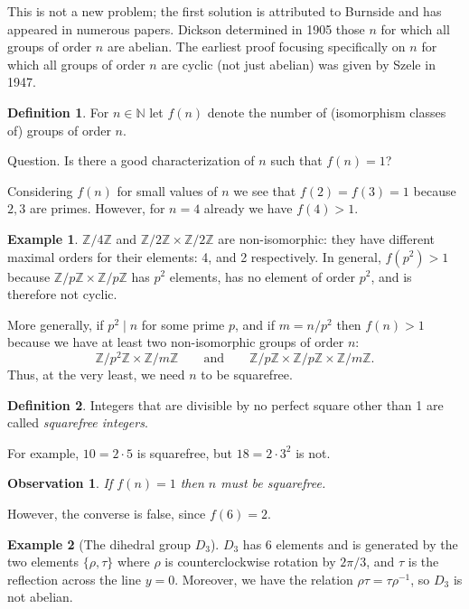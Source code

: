 \documentclass[12pt,reqno]{amsart}
\theoremstyle{plain}
\newtheorem{obs}[thm]{Observation}
\theoremstyle{definition}
\newtheorem*{defn}{Definition}
\newtheorem{eg}{Example}
\numberwithin{equation}{section}
\begin{document}
This is not a new problem; the first solution is attributed to Burnside and has appeared in numerous papers. Dickson \cite{4} determined in 1905 those $n$ for which all groups of order $n$ are abelian. The earliest proof focusing specifically on $n$ for which all groups of order $n$ are cyclic (not just abelian) was given by Szele \cite{7} in 1947.

\begin{defn}
For $n \in \mathbb{N}$ let $f(n)$ denote the number of (isomorphism classes of) groups of order $n$.
\end{defn}

{\sc Question.} Is there a good characterization of $n$ such that $f(n) = 1$?

Considering $f(n)$ for small values of $n$ we see that $f(2)=f(3)=1$ because $2, 3$ are primes. However, for $n=4$ already we have $f(4)>1$.

\begin{eg}
$\mathbb{Z}/4\mathbb{Z}$ and $\mathbb{Z}/2\mathbb{Z}\times\mathbb{Z}/2\mathbb{Z}$ are non-isomorphic: they have different maximal orders for their elements: 4, and 2 respectively. In general, $f(p^2)>1$ because $\mathbb{Z}/p\mathbb{Z}\times\mathbb{Z}/p\mathbb{Z}$ has $p^2$ elements, has no element of order $p^2$, and is therefore not cyclic.
\end{eg}

More generally, if $p^2 \mid n$ for some prime $p$, and if $m=n/p^2$ then $f(n)>1$ because we have at least two non-isomorphic groups of order $n$: \[\mathbb{Z}/p^2\mathbb{Z}\times\mathbb{Z}/m\mathbb{Z} \qquad \text{and} \qquad \mathbb{Z}/p\mathbb{Z}\times\mathbb{Z}/p\mathbb{Z}\times\mathbb{Z}/m\mathbb{Z}.\] Thus, at the very least, we need $n$ to be squarefree.

\begin{defn}
Integers that are divisible by no perfect square other than 1 are called \textit{squarefree integers}.
\end{defn}

For example, $10=2\cdot5$ is squarefree, but $18=2\cdot3^2$ is not.

\medskip
\begin{obs}
If $f(n)=1$ then $n$ must be squarefree.
\end{obs}

However, the converse is false, since $f(6)=2$.

\begin{eg}[The dihedral group $D_3$]
$D_3$ has 6 elements and is generated by the two elements $\{\rho, \tau\}$ where $\rho$ is counterclockwise rotation by $2\pi/3$, and $\tau$ is the reflection across the line $y=0$. Moreover, we have the relation $\rho\tau=\tau\rho^{-1}$, so $D_3$ is not abelian.
\end{eg}
\end{document}
